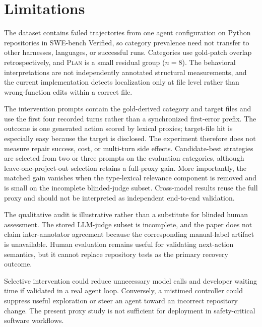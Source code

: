 \documentclass{article}
\begin{document}
\section*{Limitations}

The dataset contains failed trajectories from one agent configuration on Python
repositories in SWE-bench Verified, so category prevalence need not transfer to
other harnesses, languages, or successful runs.  Categories use gold-patch
overlap retrospectively, and \textsc{Plan} is a small residual group ($n=8$).
The behavioral interpretations are not independently annotated structural
measurements, and the current implementation detects localization only at file
level rather than wrong-function edits within a correct file.

The intervention prompts contain the gold-derived category and target files and
use the first four recorded turns rather than a synchronized first-error prefix.
The outcome is one generated action scored by lexical proxies; target-file hit
is especially easy because the target is disclosed.  The experiment therefore
does not measure repair success, cost, or multi-turn side effects.  Candidate-best
strategies are selected from two or three prompts on the evaluation categories,
although leave-one-project-out selection retains a full-proxy gain.  More
importantly, the matched gain vanishes when the type-lexical relevance component
is removed and is small on the incomplete blinded-judge subset.  Cross-model
results reuse the full proxy and should not be interpreted as independent
end-to-end validation.

The qualitative audit is illustrative rather than a substitute for blinded
human assessment.  The stored LLM-judge subset is incomplete, and the paper does
not claim inter-annotator agreement because the corresponding manual-label
artifact is unavailable.  Human evaluation remains useful for
validating next-action semantics, but it cannot replace repository tests as the
primary recovery outcome.

Selective intervention could reduce unnecessary model calls and developer
waiting time if validated in a real agent loop.  Conversely, a mistimed
controller could suppress useful exploration or steer an agent toward an
incorrect repository change.  The present proxy study is not sufficient for
deployment in safety-critical software workflows.
\end{document}
